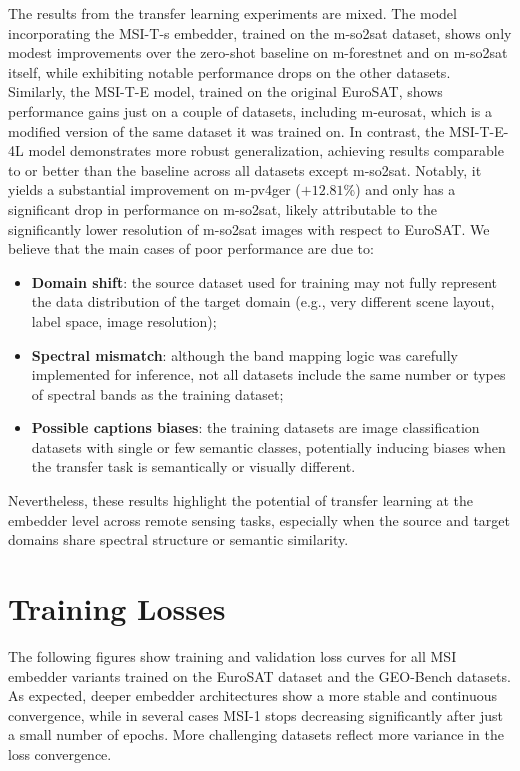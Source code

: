 \documentclass[a4paper, twoside, english]{sapthesis} %
\begin{document}
The results from the transfer learning experiments are mixed. The model incorporating the MSI-T-s embedder, trained on the m-so2sat dataset, shows only modest improvements over the zero-shot baseline on m-forestnet and on m-so2sat itself, while exhibiting notable performance drops on the other datasets. Similarly, the MSI-T-E model, trained on the original EuroSAT, shows performance gains just on a couple of datasets, including m-eurosat, which is a modified version of the same dataset it was trained on. In contrast, the MSI-T-E-4L model demonstrates more robust generalization, achieving results comparable to or better than the baseline across all datasets except m-so2sat. Notably, it yields a substantial improvement on m-pv4ger ($+12.81\%$) and only has a significant drop in performance on m-so2sat, likely attributable to the significantly lower resolution of m-so2sat images with respect to EuroSAT. We believe that the main cases of poor performance are due to:

\begin{itemize}
    \item \textbf{Domain shift}: the source dataset used for training may not fully represent the data distribution of the target domain (e.g., very different scene layout, label space, image resolution);
    \item \textbf{Spectral mismatch}: although the band mapping logic was carefully implemented for inference, not all datasets include the same number or types of spectral bands as the training dataset;
    \item \textbf{Possible captions biases}: the training datasets are image classification datasets with single or few semantic classes, potentially inducing biases when the transfer task is semantically or visually different.
\end{itemize}

Nevertheless, these results highlight the potential of transfer learning at the embedder level across remote sensing tasks, especially when the source and target domains share spectral structure or semantic similarity.

\section{Training Losses}

The following figures show training and validation loss curves for all MSI embedder variants trained on the EuroSAT dataset and the GEO-Bench datasets. As expected, deeper embedder architectures show a more stable and continuous convergence, while in several cases MSI-1 stops decreasing significantly after just a small number of epochs. More challenging datasets reflect more variance in the loss convergence. 
\end{document}
